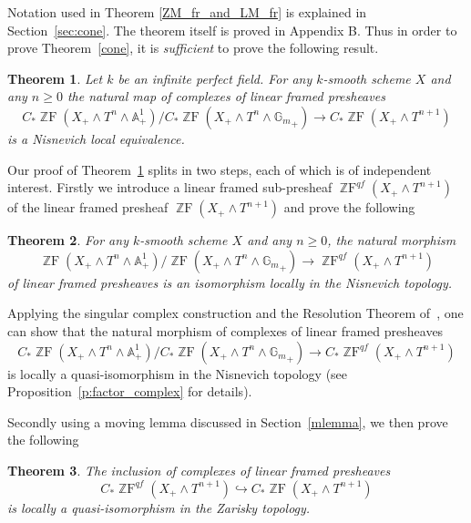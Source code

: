 \documentclass[a4paper,11pt,reqno]{amsart}
\newtheorem{theorem}{Theorem}[section]
\begin{document}
Notation used in Theorem \ref{ZM_fr_and_LM_fr} is explained in Section~\ref{sec:cone}.
The theorem itself is proved in Appendix B. Thus in order to prove Theorem~\ref{cone},
it is {\it sufficient\/} to prove the following result.

\begin{theorem}\label{th:Main}
Let $k$ be an infinite perfect field. For any $k$-smooth scheme $X$
and any $n{\geqslant} 0$ the natural map of complexes of linear framed
presheaves
   $$C_*{\operatorname{\mathbb{Z}F}}(X_+\wedge T^n \wedge {\mathbb{A}}^1_+)/C_*{\operatorname{\mathbb{Z}F}}(X_+\wedge T^n \wedge {{\mathbb{G}_m}}_+)\to C_*{\operatorname{\mathbb{Z}F}}(X_+\wedge T^{n+1})$$
is a Nisnevich local equivalence.
\end{theorem}

Our proof of Theorem~\ref{th:Main} splits in two steps, each of
which is of independent interest. Firstly we introduce a linear
framed sub-presheaf ${\operatorname{\mathbb{Z}F}}^{qf}(X_+\wedge T^{n+1})$ of the linear
framed presheaf ${\operatorname{\mathbb{Z}F}}(X_+\wedge T^{n+1})$ and prove the following

\begin{theorem}\label{p:main}
For any $k$-smooth scheme $X$ and any $n{\geqslant} 0$, the natural
morphism
   $${\operatorname{\mathbb{Z}F}}(X_+\wedge T^n\wedge{\mathbb{A}}^1_+)/{\operatorname{\mathbb{Z}F}}(X_+\wedge T^n\wedge {{\mathbb{G}_m}}_+)\to {\operatorname{\mathbb{Z}F}}^{qf}(X_+\wedge T^{n+1})$$
of linear framed presheaves is an isomorphism locally in the
Nisnevich topology.
\end{theorem}

Applying the singular complex construction and the Resolution
Theorem of~\cite{GP1}, one can show that the natural morphism of
complexes of linear framed presheaves
   \begin{equation}\label{eq:factor_complex}
    C_*{\operatorname{\mathbb{Z}F}}(X_+\wedge T^n\wedge{\mathbb{A}}^1_+)/C_*{\operatorname{\mathbb{Z}F}}(X_+\wedge T^n\wedge{{\mathbb{G}_m}}_+)\to C_*{\operatorname{\mathbb{Z}F}}^{qf}(X_+\wedge T^{n+1})
   \end{equation}
is locally a quasi-isomorphism in the Nisnevich topology (see
Proposition~\ref{p:factor_complex} for details).

Secondly using a moving lemma discussed in Section~\ref{mlemma}, we
then prove the following

\begin{theorem}\label{p:moving}
The inclusion of complexes of linear framed presheaves
$$C_*{\operatorname{\mathbb{Z}F}}^{qf}(X_+\wedge T^{n+1}) \hookrightarrow C_*{\operatorname{\mathbb{Z}F}}(X_+\wedge T^{n+1})$$
is locally a quasi-isomorphism in the Zarisky topology.
\end{theorem}
\end{document}
